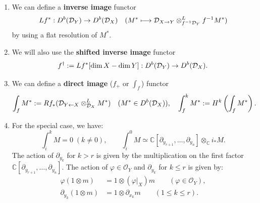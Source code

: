 \begin{remark}
\begin{enumerate}
        \item We can define a \textbf{inverse image} functor
              $$
                  Lf^* : D^b(\mathcal{D}_Y) \to D^b(\mathcal{D}_X) \quad (M^* \longmapsto \mathcal{D}_{X \to Y} \otimes_{f^{-1}\mathcal{D}_Y}^L f^{-1}M^*)
              $$
              by using a flat resolution of $M^*$.
        \item We will also use the \textbf{shifted inverse image} functor
              $$
                  f^\dagger := Lf^*[\dim X - \dim Y] : D^b(\mathcal{D}_Y) \to D^b(\mathcal{D}_X).
              $$
        \item We can define a \textbf{direct image} ($f_+$ or $\int_f$) functor
              $$
                  \int_f M^* := Rf_*(\mathcal{D}_{Y \leftarrow X} \otimes_{\mathcal{D}_X}^L M^*) \quad (M^* \in D^b(\mathcal{D}_X)),\quad \int_f^k M^* := H^k \left( \int_f M^* \right).
              $$
        \item \cite[Ex.~1.5.23.]{hotta2008d} For the special case, we have:
              $$
                  \int_i^k M = 0 \; (k \ne 0), \qquad \int_i^0 M \simeq \mathbb{C}[\partial_{y_{r+1}}, \dots, \partial_{y_n}] \otimes_{\mathbb{C}} i_* M.
              $$
              The action of $\partial_{y_k}$ for $k > r$ is given by the multiplication on the first factor $\mathbb{C}[\partial_{y_{r+1}}, \dots, \partial_{y_n}]$.
              The action of $\varphi \in \mathcal{O}_Y$ and $\partial_{y_k}$ for $k \le r$ is given by:
              \begin{align*}
                  \varphi(1 \otimes m)        & = 1 \otimes (\varphi|_X)m \qquad (\varphi \in \mathcal{O}_Y), \\
                  \partial_{y_k}(1 \otimes m) & = 1 \otimes \partial_{x_k}m \qquad (1 \le k \le r).
              \end{align*}


\end{enumerate}
\end{remark}
